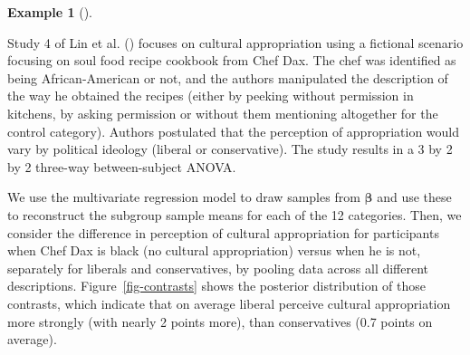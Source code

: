 \documentclass[
  11pt,
  letterpaper,
]{scrbook}
\theoremstyle{definition}
\newtheorem{example}{Example}[chapter]
\theoremstyle{plain}
\theoremstyle{plain}
\theoremstyle{plain}
\theoremstyle{definition}
\theoremstyle{definition}
\theoremstyle{plain}
\theoremstyle{plain}
\theoremstyle{remark}
\begin{document}
\begin{example}[]\protect\hypertarget{exm-regression}{}\label{exm-regression}

Study 4 of Lin et al. () focuses on
cultural appropriation using a fictional scenario focusing on soul food
recipe cookbook from Chef Dax. The chef was identified as being
African-American or not, and the authors manipulated the description of
the way he obtained the recipes (either by peeking without permission in
kitchens, by asking permission or without them mentioning altogether for
the control category). Authors postulated that the perception of
appropriation would vary by political ideology (liberal or
conservative). The study results in a 3 by 2 by 2 three-way
between-subject ANOVA.

We use the multivariate regression model to draw samples from
\(\boldsymbol{\beta}\) and use these to reconstruct the subgroup sample
means for each of the 12 categories. Then, we consider the difference in
perception of cultural appropriation for participants when Chef Dax is
black (no cultural appropriation) versus when he is not, separately for
liberals and conservatives, by pooling data across all different
descriptions. Figure~\ref{fig-contrasts} shows the posterior
distribution of those contrasts, which indicate that on average liberal
perceive cultural appropriation more strongly (with nearly 2 points
more), than conservatives (0.7 points on average).


\end{example}
\end{document}
